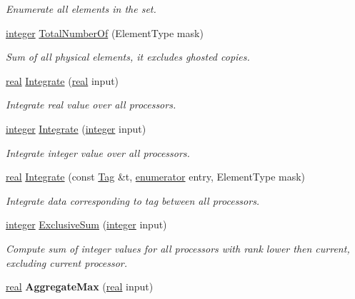 \begin{DoxyCompactItemize}
\begin{DoxyCompactList}\small\item\em Enumerate all elements in the set. \end{DoxyCompactList}\item 
\hyperlink{classINMOST_1_1Storage_aec96942bc647417a801e2895b45964d2}{integer} \hyperlink{classINMOST_1_1Mesh_acc118e878e2cce11985e7384f18700fa}{Total\-Number\-Of} (Element\-Type mask)
\begin{DoxyCompactList}\small\item\em Sum of all physical elements, it excludes ghosted copies. \end{DoxyCompactList}\item 
\hyperlink{classINMOST_1_1Storage_a853346784b4a5822a7fac54d8f10f805}{real} \hyperlink{classINMOST_1_1Mesh_ab90d3db6596d5de6f7ddfd7f72af600f}{Integrate} (\hyperlink{classINMOST_1_1Storage_a853346784b4a5822a7fac54d8f10f805}{real} input)
\begin{DoxyCompactList}\small\item\em Integrate real value over all processors. \end{DoxyCompactList}\item 
\hyperlink{classINMOST_1_1Storage_aec96942bc647417a801e2895b45964d2}{integer} \hyperlink{classINMOST_1_1Mesh_a541bea07883f3afa0be27748edb479ff}{Integrate} (\hyperlink{classINMOST_1_1Storage_aec96942bc647417a801e2895b45964d2}{integer} input)
\begin{DoxyCompactList}\small\item\em Integrate integer value over all processors. \end{DoxyCompactList}\item 
\hyperlink{classINMOST_1_1Storage_a853346784b4a5822a7fac54d8f10f805}{real} \hyperlink{classINMOST_1_1Mesh_abb1eacb17ae889557d9d9d32d7b61ed0}{Integrate} (const \hyperlink{classINMOST_1_1Tag}{Tag} \&t, \hyperlink{classINMOST_1_1Storage_ae333dfced6fa9cfde0c8e7dcf1b0cc2b}{enumerator} entry, Element\-Type mask)
\begin{DoxyCompactList}\small\item\em Integrate data corresponding to tag between all processors. \end{DoxyCompactList}\item 
\hyperlink{classINMOST_1_1Storage_aec96942bc647417a801e2895b45964d2}{integer} \hyperlink{classINMOST_1_1Mesh_a8ac1be80eb3f359e6d2834f212131200}{Exclusive\-Sum} (\hyperlink{classINMOST_1_1Storage_aec96942bc647417a801e2895b45964d2}{integer} input)
\begin{DoxyCompactList}\small\item\em Compute sum of integer values for all processors with rank lower then current, excluding current processor. \end{DoxyCompactList}\item 
\hypertarget{classINMOST_1_1Mesh_a2a95b3b375dde1ba544ec0689ce1610f}{\hyperlink{classINMOST_1_1Storage_a853346784b4a5822a7fac54d8f10f805}{real} {\bfseries Aggregate\-Max} (\hyperlink{classINMOST_1_1Storage_a853346784b4a5822a7fac54d8f10f805}{real} input)}\label{classINMOST_1_1Mesh_a2a95b3b375dde1ba544ec0689ce1610f}


\end{DoxyCompactItemize}
